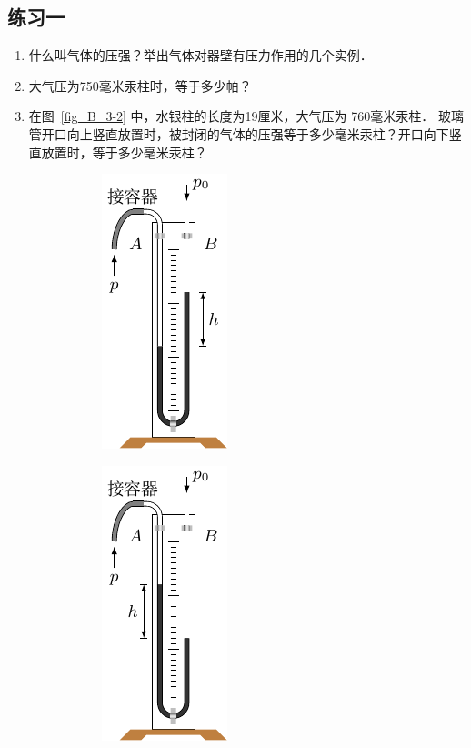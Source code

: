 \subsection*{练习一}
\begin{enumerate}
    \item 什么叫气体的压强？举出气体对器壁有压力作用的几个实例．
    \item 大气压为750毫米汞柱时，等于多少帕？
        \item 在图~\ref{fig_B_3-2} 中，水银柱的长度为19厘米，大气压为
    760毫米汞柱．
    玻璃管开口向上竖直放置时，被封闭的气体的压强等于多少毫米汞柱？开口向下竖直放置时，等于多少毫米汞柱？
\begin{figure}[htbp]
    \centering
    \begin{subfigure}{0.4\linewidth}
        \centering
        \includegraphics{fig/B/3-3a.pdf}
        \caption{}\label{fig_B_3-3a}
    \end{subfigure}
    \hfil
    \begin{subfigure}{0.4\linewidth}
        \centering
        \includegraphics{fig/B/3-3b.pdf}
        \caption{}\label{fig_B_3-3b}
    \end{subfigure}
    \caption{}\label{fig_B_3-3}
\end{figure}



\end{enumerate}
